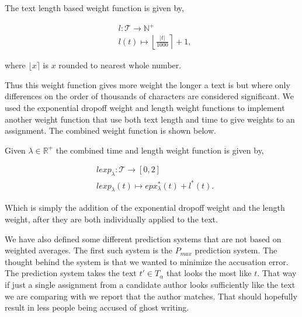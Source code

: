 \begin{definition}

    The text length based weight function is given by,

    \begin{align}
        &l \colon \mathcal{T} \rightarrow \mathbb{N}^+ \\
        &l(t) \mapsto \left\lfloor \frac{|t|}{1000} \right\rceil + 1,
    \end{align}

    where $\lfloor x \rceil$ is $x$ rounded to nearest whole number.

\end{definition}

Thus this weight function gives more weight the longer a text is but where only
differences on the order of thousands of characters are considered significant.
We used the exponential dropoff weight and length weight functions to implement
another weight function that use both text length and time to give weights to an
assignment. The combined weight function is shown below.

\begin{definition}

    Given $\lambda \in \mathbb{R}^+$ the combined time and length weight
    function is given by,

    \begin{align}
        &lexp_\lambda \colon \mathcal{T} \rightarrow [0, 2] \\
        &lexp_\lambda(t) \mapsto epx^*_\lambda(t) + l^*(t).
    \end{align}

\end{definition}

Which is simply the addition of the exponential dropoff weight and the length
weight, after they are both individually applied to the text.

We have also defined some different prediction systems that are not based on
weighted averages. The first such system is the $P_{max}$ prediction system.
The thought behind the system is that we wanted to minimize the accusation
error. The prediction system takes the text $t' \in T_\alpha$ that looks the
most like $t$. That way if just a single assignment from a candidate author
looks sufficiently like the text we are comparing with we report that the author
matches. That should hopefully result in less people being accused of ghost
writing.

